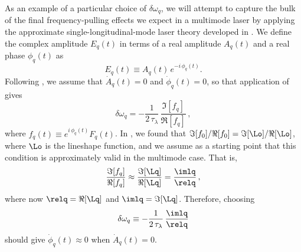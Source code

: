 As an example of a particular choice of $\delta \omega_q$, we will attempt to capture the bulk of the final frequency-pulling effects we expect in a multimode laser by applying the approximate single-longitudinal-mode laser theory developed in . We define the complex amplitude $E_q(t)$ in terms of a real amplitude $A_q(t)$ and a real phase $\phi_q(t)$ as
 \begin{equation}\label{eqn:mml_1d_aq_phiq_def}
E_q(t) \equiv A_q(t)\, e^{-i\, \phi_q(t)} .
 \end{equation}
Following , we assume that $\dot{A}_q(t) = 0$ and $\dot{\phi}_q(t) = 0$, so that application of  gives
 \begin{equation} \label{eqn:mml_1d_dwq}
\delta \omega_q = -\frac{1}{2\, \tau_\lambda}\, \frac{\Im[f_q]}{\Re[f_q]}\, ,
 \end{equation}
where $f_q(t) \equiv e^{i\, \phi_q(t)} F_q(t)$.
In , we found that $\Im[f_0]/\Re[f_0] = \Im[\Lo]/\Re[\Lo]$, where $\Lo$ is the lineshape function, and we assume as a starting point that this condition is approximately valid in the multimode case. That is,
\begin{equation}
    \frac{\Im[f_q]}{\Re[f_q]} \approx \frac{\Im[\Lq]}{\Re[\Lq]} = \frac{\imlq}{\relq}\, ,
\end{equation}
where now $\relq = \Re[\Lq]$ and $\imlq = \Im[\Lq]$. Therefore, choosing
\begin{equation}
    \delta \omega_q \equiv -\frac{1}{2\, \tau_\lambda}\, \frac{\imlq}{\relq}
\end{equation}
should give $\dot{\phi}_q(t) \approx 0$ when $\dot{A}_q(t) = 0$.

